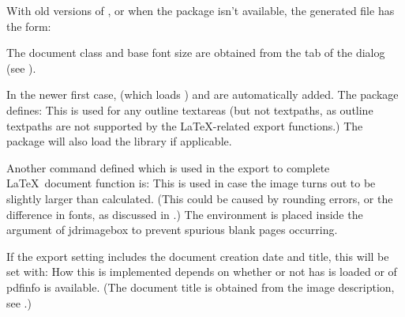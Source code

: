 With old versions of \FlowframTk, or when the 
package isn't available, the generated  file has the form:
\begin{compactcodebox}
\strut
{}










\end{compactcodebox}

The document class  and base font size
 are obtained from the
 tab of the
 dialog (see ).

In the newer first case,  (which loads
) and  are automatically added.
The  package defines:
This is used for any outline \glspl{textarea} (but not
\glspl{textpath}, as outline \glspl*{textpath} are not supported by
the \LaTeX-related export functions.) The package will also load the 
 library if applicable. 

Another command defined  which is used in the
export to complete \LaTeX\ document function is:
This is used in case the image turns out to be slightly larger than
calculated. (This could be caused by rounding errors, or the
difference in fonts, as discussed in .)
The  environment is placed inside the argument of
\gls{jdrimagebox} to prevent spurious blank pages occurring.

If the export setting includes the document creation date and
title, this will be set with:
How this is implemented depends on whether or not  has
is loaded or of \gls{pdfinfo} is available.
(The document title is obtained from the image description, see
.)

